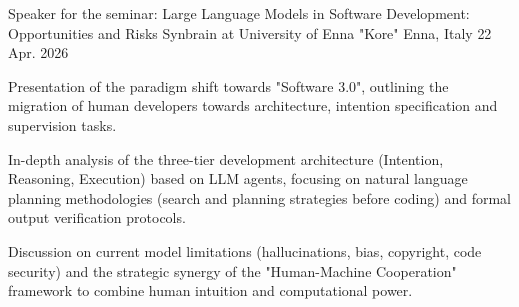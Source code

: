 

\begin{cventries}

  \cventry
    {Speaker for the seminar: Large Language Models in Software Development: Opportunities and Risks} %
    {Synbrain at University of Enna "Kore"} %
    {Enna, Italy} %
    {22 Apr. 2026} %
    {
      \begin{cvitems} %
        \item {Presentation of the paradigm shift towards "Software 3.0", outlining the migration of human developers towards architecture, intention specification and supervision tasks.}
        \item {In-depth analysis of the three-tier development architecture (Intention, Reasoning, Execution) based on LLM agents, focusing on natural language planning methodologies (search and planning strategies before coding) and formal output verification protocols.}
        \item {Discussion on current model limitations (hallucinations, bias, copyright, code security) and the strategic synergy of the "Human-Machine Cooperation" framework to combine human intuition and computational power.}
      \end{cvitems}
    }

\end{cventries}
